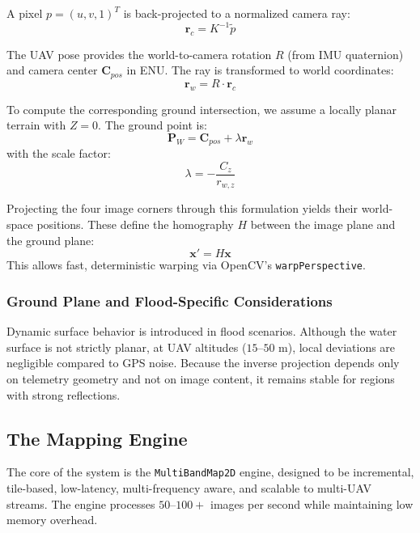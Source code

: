 \documentclass[conference]{IEEEtran}
\begin{document}
A pixel $p = (u, v, 1)^T$ is back-projected to a normalized camera ray:
\begin{equation}
\mathbf{r}_c = K^{-1} \tilde{p}
\end{equation}

The UAV pose provides the world-to-camera rotation $R$ (from IMU quaternion) and camera center $\mathbf{C}_{pos}$ in ENU. The ray is transformed to world coordinates:
\begin{equation}
\mathbf{r}_w = R \cdot \mathbf{r}_c
\end{equation}

To compute the corresponding ground intersection, we assume a locally planar terrain with $Z = 0$. The ground point is:
\begin{equation}
\mathbf{P}_{W} = \mathbf{C}_{pos} + \lambda \mathbf{r}_w
\end{equation}
with the scale factor:
\begin{equation}
\lambda = -\frac{C_z}{r_{w,z}}
\end{equation}

Projecting the four image corners through this formulation yields their world-space positions. These define the homography $H$ between the image plane and the ground plane:
\begin{equation}
\mathbf{x}' = H \mathbf{x}
\end{equation}
This allows fast, deterministic warping via OpenCV's \texttt{warpPerspective}.

\subsubsection{Ground Plane and Flood-Specific Considerations}
Dynamic surface behavior is introduced in flood scenarios. Although the water surface is not strictly planar, at UAV altitudes ($15$--$50$ m), local deviations are negligible compared to GPS noise. Because the inverse projection depends only on telemetry geometry and not on image content, it remains stable for regions with strong reflections.

\subsection{The Mapping Engine}
The core of the system is the \texttt{MultiBandMap2D} engine, designed to be incremental, tile-based, low-latency, multi-frequency aware, and scalable to multi-UAV streams. The engine processes $50$--$100+$ images per second while maintaining low memory overhead.
\end{document}
